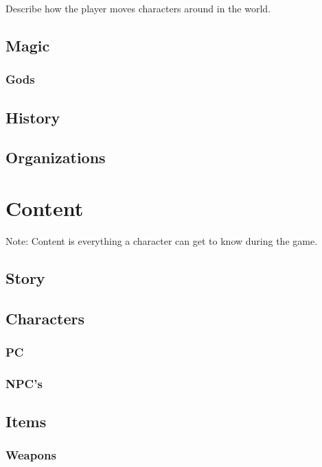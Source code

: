 \documentclass[a4paper]{report}
\begin{document}
			Describe how the player moves characters around in the world.

	\chapter{Magic}

		\section{Gods}

	\chapter{History}

	\chapter{Organizations}

\part{Content}

Note: Content is everything a character can get to know during the game.

	\chapter{Story}

	\chapter{Characters}

		\section{PC}

		\section{NPC's}

	\chapter{Items}

		\section{Weapons}
\end{document}

